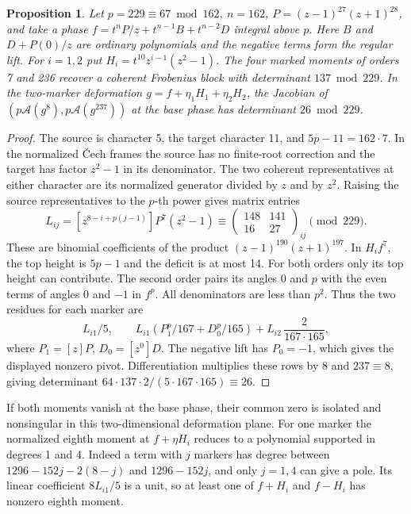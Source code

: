 \documentclass[11pt]{article}
\newtheorem{proposition}[theorem]{Proposition}
\newcommand{\A}{\mathcal A}
\begin{document}
\begin{samepage}
\begin{proposition}\label{prop:rank229}
Let \(p=229\equiv67\bmod162\), \(n=162\), \(P=(z-1)^{27}(z+1)^{28}\), and take
a phase \(f=t^n P/z+t^{n-1}B+t^{n-2}D\) integral above \(p\).
Here \(B\) and \(D+P(0)/z\) are ordinary polynomials and
the negative terms form the regular lift. For \(i=1,2\) put
\(H_i=t^{10}z^{i-1}(z^2-1)\). The four marked moments of
orders 7 and 236 recover a coherent Frobenius block with
determinant \(137\bmod229\). In the two-marker deformation
\(g=f+\eta_1H_1+\eta_2H_2\), the Jacobian of
\((p\A(g^8),p\A(g^{237}))\) at the base phase has
determinant \(26\bmod229\).
\end{proposition}
\end{samepage}
\begin{proof}
The source is character 5, the target character 11, and
\(5p-11=162\cdot7\). In the normalized \v{C}ech frames the
source has no finite-root correction and the target has
factor \(z^2-1\) in its denominator. The two coherent
representatives at either character are its normalized
generator divided by \(z\) and by \(z^2\).
Raising the source representatives to the \(p\)-th power
gives matrix entries
\[
       L_{ij}=[z^{8-i+p(j-1)}]P^7(z^2-1)
         \equiv\begin{pmatrix}148&141\\16&27\end{pmatrix}_{ij}
             \pmod {229}.
\]
These are binomial coefficients of the product
\((z-1)^{190}(z+1)^{197}\).
In \(H_i f^7\), the top height is \(5p-1\) and the deficit
is at most 14. For both orders only its top height can
contribute. The second order pairs its angles 0 and \(p\)
with the even terms of angles 0 and \(-1\) in \(f^p\).
All denominators are less than \(p^2\). Thus the two
residues for each marker are
\[
     L_{i1}/5,\qquad
     L_{i1}\left(P_1^p/167+D_0^p/165\right)
                         + L_{i2}\,\frac{2}{167\cdot165},
\]
where \(P_1=[z]P\), \(D_0=[z^0]D\). The negative lift has
\(P_0=-1\), which gives the displayed nonzero pivot.
Differentiation multiplies these rows by \(8\) and
\(237\equiv8\), giving determinant
\(64\cdot137\cdot2/(5\cdot167\cdot165)\equiv26\).
\end{proof}

If both moments vanish at the base phase, their common zero is
isolated and nonsingular in this two-dimensional deformation
plane. For one marker the normalized eighth moment at
\(f+\eta H_i\) reduces to a polynomial supported in degrees 1
and 4. Indeed a term with \(j\) markers has degree between
\(1296-152j-2(8-j)\) and \(1296-152j\), and only \(j=1,4\)
can give a pole. Its linear coefficient \(8L_{i1}/5\) is a
unit, so at least one of \(f+H_i\) and \(f-H_i\) has
nonzero eighth moment.
\end{document}
